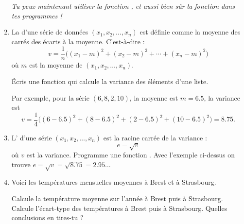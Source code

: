 \documentclass[11pt,class=report,crop=false]{standalone}
\begin{document}
\begin{activite}
\begin{enumerate}
\begin{fonctionpython}
  \end{fonctionpython}   
  
  \emph{Tu peux maintenant utiliser la fonction , et aussi bien sûr la fonction  dans tes programmes !} 
  
  \item La  d'une série de données $(x_1,x_2,\ldots,x_n)$ est définie comme la moyenne des carrés des écarts à la moyenne. C'est-à-dire :
  $$v = \frac{1}{n}\big((x_1-m)^2 + (x_2-m)^2 + \cdots + (x_n-m)^2\big)$$
  où $m$ est la moyenne de $(x_1,x_2,\ldots,x_n)$.
  
  Écris une fonction  qui calcule la variance des éléments d'une liste.
  
  Par exemple, pour la série $(6,8,2,10)$, la moyenne est $m = 6.5$, la variance est
  $$v = \frac{1}{4} \big((6-6.5)^2 + (8-6.5)^2 + (2-6.5)^2 + (10-6.5)^2\big) = 8.75.$$
  
  \item L' d'une série $(x_1,x_2,\ldots,x_n)$ est la racine carrée de la variance :
  $$e = \sqrt{v}$$
  où $v$ est la variance. Programme une fonction .
  Avec l'exemple ci-dessus on trouve $e = \sqrt{v} = \sqrt{8.75} = 2.95\ldots$
  

  \item Voici les températures mensuelles moyennes à Brest et à Strasbourg.

{\small	  
}

  Calcule la température moyenne sur l'année à Brest puis à Strasbourg. Calcule l'écart-type 
  des températures à Brest puis à Strasbourg. Quelles conclusions en tires-tu ? 

\end{enumerate}

\end{activite}



\end{document}
